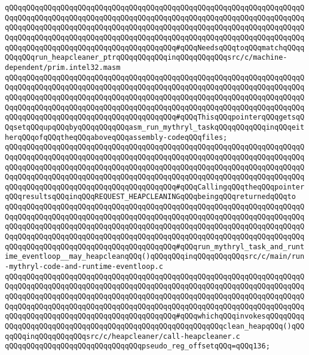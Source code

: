 \verb|qQQqqQQqqQQqqQQqqQQqqQQqqQQqqQQqqQQqqQQqqQQqqQQqqQQqqQQqqQQqqQQqqQQqqQQqqQQqqQQqqQQqqQQqqQQqqQQqqQQqqQQqqQQqqQQqqQQqqQQqqQQqqQQqqQQqqQQqqQQqqQQqqQQqqQQqqQQqqQQqqQQqqQQqqQQqqQQqqQQqqQQqqQQqqQQqqQQqqQQqqQQqqQQqqQQqqQQqqQQqqQQqqQQqqQQqqQQqqQQqqQQqqQQqqQQqqQQqqQQqqQQqqQQqqQQqqQQqqQQqqQQqqQQqqQQqqQQqqQQqqQQqqQQqqQQqqQQqqQQq#qQQqNeedsqQQqtoqQQqmatchqQQqqQQqqQQqrun_heapcleaner_ptrqQQqqQQqqQQqinqQQqqQQqqQQqsrc/c/machine-dependent/prim.intel32.masm|\newline
\verb|qQQqqQQqqQQqqQQqqQQqqQQqqQQqqQQqqQQqqQQqqQQqqQQqqQQqqQQqqQQqqQQqqQQqqQQqqQQqqQQqqQQqqQQqqQQqqQQqqQQqqQQqqQQqqQQqqQQqqQQqqQQqqQQqqQQqqQQqqQQqqQQqqQQqqQQqqQQqqQQqqQQqqQQqqQQqqQQqqQQqqQQqqQQqqQQqqQQqqQQqqQQqqQQqqQQqqQQqqQQqqQQqqQQqqQQqqQQqqQQqqQQqqQQqqQQqqQQqqQQqqQQqqQQqqQQqqQQqqQQqqQQqqQQqqQQqqQQqqQQqqQQqqQQqqQQqqQQqqQQq#qQQqThisqQQqpointerqQQqgetsqQQqsetqQQqupqQQqbyqQQqqQQqqQQqasm_run_mythryl_taskqQQqqQQqqQQqinqQQqeitherqQQqofqQQqtheqQQqaboveqQQqassembly-codeqQQqfiles;|\newline
\verb|qQQqqQQqqQQqqQQqqQQqqQQqqQQqqQQqqQQqqQQqqQQqqQQqqQQqqQQqqQQqqQQqqQQqqQQqqQQqqQQqqQQqqQQqqQQqqQQqqQQqqQQqqQQqqQQqqQQqqQQqqQQqqQQqqQQqqQQqqQQqqQQqqQQqqQQqqQQqqQQqqQQqqQQqqQQqqQQqqQQqqQQqqQQqqQQqqQQqqQQqqQQqqQQqqQQqqQQqqQQqqQQqqQQqqQQqqQQqqQQqqQQqqQQqqQQqqQQqqQQqqQQqqQQqqQQqqQQqqQQqqQQqqQQqqQQqqQQqqQQqqQQqqQQqqQQqqQQqqQQq#qQQqCallingqQQqtheqQQqpointerqQQqresultsqQQqinqQQqREQUEST_HEAPCLEANINGqQQqbeingqQQqreturnedqQQqto|\newline
\verb|qQQqqQQqqQQqqQQqqQQqqQQqqQQqqQQqqQQqqQQqqQQqqQQqqQQqqQQqqQQqqQQqqQQqqQQqqQQqqQQqqQQqqQQqqQQqqQQqqQQqqQQqqQQqqQQqqQQqqQQqqQQqqQQqqQQqqQQqqQQqqQQqqQQqqQQqqQQqqQQqqQQqqQQqqQQqqQQqqQQqqQQqqQQqqQQqqQQqqQQqqQQqqQQqqQQqqQQqqQQqqQQqqQQqqQQqqQQqqQQqqQQqqQQqqQQqqQQqqQQqqQQqqQQqqQQqqQQqqQQqqQQqqQQqqQQqqQQqqQQqqQQqqQQqqQQqqQQqqQQq#qQQqrun_mythryl_task_and_runtime_eventloop__may_heapcleanqQQq()qQQqqQQqinqQQqqQQqqQQqsrc/c/main/run-mythryl-code-and-runtime-eventloop.c|\newline
\verb|qQQqqQQqqQQqqQQqqQQqqQQqqQQqqQQqqQQqqQQqqQQqqQQqqQQqqQQqqQQqqQQqqQQqqQQqqQQqqQQqqQQqqQQqqQQqqQQqqQQqqQQqqQQqqQQqqQQqqQQqqQQqqQQqqQQqqQQqqQQqqQQqqQQqqQQqqQQqqQQqqQQqqQQqqQQqqQQqqQQqqQQqqQQqqQQqqQQqqQQqqQQqqQQqqQQqqQQqqQQqqQQqqQQqqQQqqQQqqQQqqQQqqQQqqQQqqQQqqQQqqQQqqQQqqQQqqQQqqQQqqQQqqQQqqQQqqQQqqQQqqQQqqQQqqQQqqQQqqQQq#qQQqwhichqQQqinvokesqQQqqQQqqQQqqQQqqQQqqQQqqQQqqQQqqQQqqQQqqQQqqQQqqQQqqQQqqQQqclean_heapqQQq()qQQqqQQqinqQQqqQQqqQQqsrc/c/heapcleaner/call-heapcleaner.c|\newline
\verb|qQQqqQQqqQQqqQQqqQQqqQQqqQQqqQQqpseudo_reg_offsetqQQq=qQQq136;|\newline
